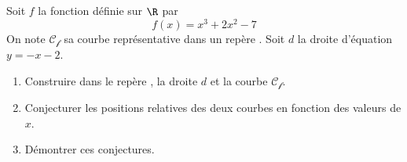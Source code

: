 
Soit $f$ la fonction définie sur $\R$ par $$f(x)=x^3+2x^2-7$$  On note $\mathcal{C_f}$ sa courbe représentative dans un repère \Oij. Soit $d$ la droite d'équation $y=-x-2$.
 \begin{enumerate}
 \item Construire dans le repère \Oij, la droite $d$ et la courbe $\mathcal{C_f}$.
  \item Conjecturer les positions relatives des deux courbes en fonction des valeurs de $x$.
   \item Démontrer ces conjectures. 
 \end{enumerate}


